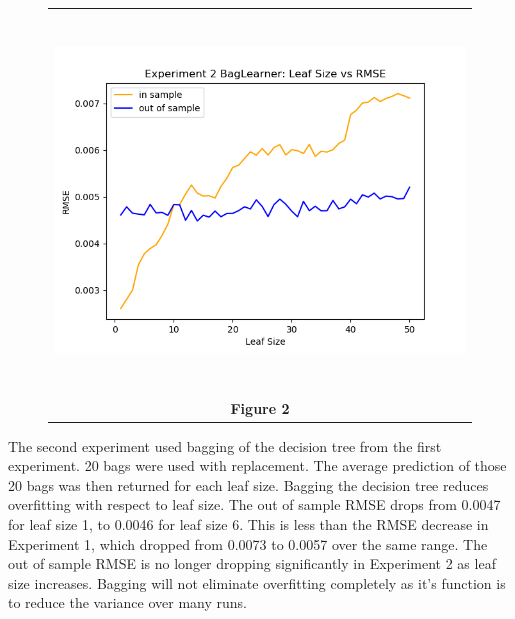 \documentclass[
	letterpaper, %
]{jdf}
\begin{document}
\begin{figure}[h]
	\begin{tabular}{c}
		\includegraphics[height=10cm]{experiment_2.png} \\
		\textbf{Figure 2} \\
	\end{tabular}
\end{figure}

The second experiment used bagging of the decision tree from the first experiment.  20 bags were used with replacement.  The average prediction of those 20 bags was then returned for each leaf size. Bagging the decision tree reduces overfitting with respect to leaf size.  The out of sample RMSE drops from 0.0047 for leaf size 1, to 0.0046 for leaf size 6.  This is less than the RMSE decrease in Experiment 1, which dropped from 0.0073 to 0.0057 over the same range. The out of sample RMSE is no longer dropping significantly in Experiment 2 as leaf size increases.  Bagging will not eliminate overfitting completely as it's function is to reduce the variance over many runs.

\pagebreak
\end{document}
